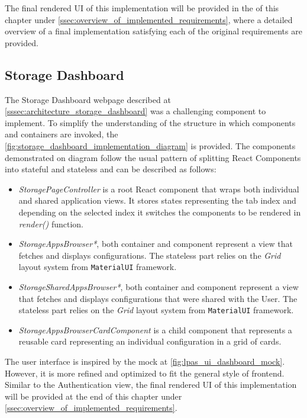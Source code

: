 The final rendered UI of this implementation will be provided in the of this chapter under \autoref{ssec:overview_of_implemented_requirements}, where a detailed overview of a final implementation satisfying each of the original \lpa{} requirements are provided.

\subsection{Storage Dashboard}
\label{sssec:storage_dashboard_implementation}

The Storage Dashboard webpage described at \autoref{sssec:architecture_storage_dashboard} was a challenging component to implement. To simplify the understanding of the structure in which components and containers are invoked, the \autoref{fig:storage_dashboard_implementation_diagram} is provided. The components demonstrated on diagram follow the usual pattern of splitting React Components into stateful and stateless and can be described as follows:
\begin{itemize}
    \item \textit{StoragePageController} is a root React component that wraps both individual and shared application views. It stores states representing the tab index and depending on the selected index it switches the components to be rendered in \textit{render()} function.
    \item \textit{StorageAppsBrowser*}, both container and component represent a view that fetches and displays \lpa{} configurations. The stateless part relies on the \textit{Grid} layout system from \texttt{MaterialUI} framework.
    \item \textit{StorageSharedAppsBrowser*}, both container and component represent a view that fetches and displays \lpa{} configurations that were shared with the User. The stateless part relies on the \textit{Grid} layout system from \texttt{MaterialUI} framework.
    \item \textit{StorageAppsBrowserCardComponent} is a child component that represents a reusable card representing an individual \lpa{} configuration in a grid of cards.
\end{itemize}

The user interface is inspired by the mock at \autoref{fig:lpas_ui_dashboard_mock}. However, it is more refined and optimized to fit the general style of \lpa{} frontend. Similar to the Authentication view, the final rendered UI of this implementation will be provided at the end of this chapter under \autoref{ssec:overview_of_implemented_requirements}.

